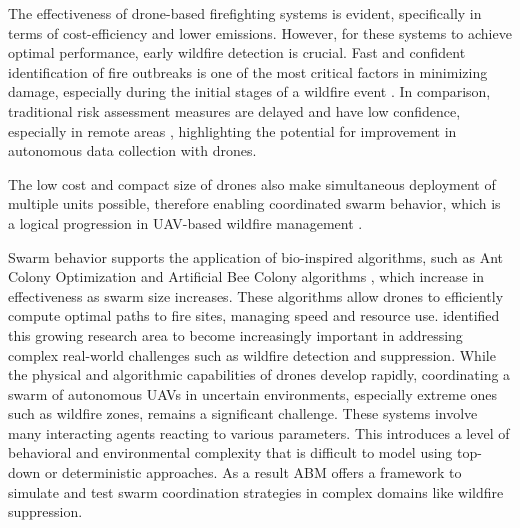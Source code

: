 \documentclass[11pt, a4paper]{article}
\begin{document}
The effectiveness of drone-based firefighting systems is evident, specifically in terms of cost-efficiency and lower emissions. However, for these systems to achieve optimal performance, early wildfire detection is crucial. Fast and confident identification of fire outbreaks is one of the most critical factors in minimizing damage, especially during the initial stages of a wildfire event \citep{Sudhakar2020}.
In comparison, traditional risk assessment measures are delayed and have low confidence, especially in remote areas \citep{Afghah2019}, highlighting the potential for improvement in autonomous data collection \citep{Lelis2024} with drones.

The low cost and compact size of drones also make simultaneous deployment of multiple units possible, therefore enabling coordinated swarm behavior, which is a logical progression in UAV-based wildfire management \citep{MetaanalysisHumansystemInterfaces}. 

Swarm behavior supports the application of bio-inspired algorithms, such as Ant Colony Optimization \citep{HybridAntColonyWildfire} and Artificial Bee Colony algorithms \citep{karaboga2007abc}, which increase in effectiveness as swarm size increases. These algorithms allow drones to efficiently compute optimal paths to fire sites, managing speed and resource use. \citet*{MetaanalysisHumansystemInterfaces} identified this growing research area to become increasingly important in addressing complex real-world challenges such as wildfire detection and suppression.
While the physical and algorithmic capabilities of drones develop rapidly, coordinating a swarm of autonomous UAVs in uncertain environments, especially extreme ones such as wildfire zones, remains a significant challenge. These systems involve many interacting agents reacting to various parameters. This introduces a level of behavioral and environmental complexity that is difficult to model using top-down or deterministic approaches. As a result ABM offers a framework to simulate and test swarm coordination strategies in complex domains like wildfire suppression.
\end{document}
